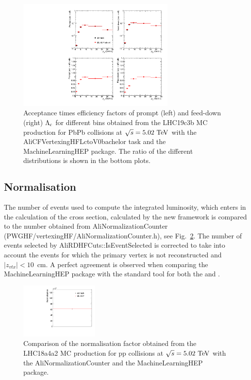 \begin{figure}[tb]
\begin{center}
\includegraphics[width=0.7\textwidth]{figures/LcEfficiencyComparison.pdf}
\caption{Acceptance times efficiency factors of prompt (left) and feed-down (right) $\mbox{$\mathrm {\Lambda_{c}}$}$ for different \pt bins obtained from the LHC19c3b MC production for PbPb collisions at $\sqrt{s}=5.02~\mathrm{TeV}$ with the AliCFVertexingHFLctoV0bachelor task and the MachineLearningHEP package. The ratio of the different distributions is shown in the bottom plots. }
\label{fig:EffLcComparisonMCPbPb}
\end{center}
\end{figure}

\subsection{Normalisation}
\label{subsec:normValidation}

The number of events used to compute the integrated luminosity, which enters in the calculation of the cross section, calculated by the new framework is compared to the number obtained from AliNormalizationCounter (PWGHF/vertexingHF/AliNormalizationCounter.h), see Fig.~\ref{fig:NormalisationComparisonMCpp}. The number of events selected by AliRDHFCuts::IsEventSelected is corrected to take into account the events for which the primary vertex is not reconstructed and $|z_{vtx}|<10$~cm. A perfect agreement is observed when comparing the MachineLearningHEP package with the standard tool for both the \Ds and \Lc.
 
 \begin{figure}[tb]
\begin{center}
\includegraphics[width=0.35\textwidth]{figures/NormComparison.pdf}
\caption{Comparison of the normalisation factor obtained from the LHC18a4a2 MC production for pp collisions at $\sqrt{s}=5.02~\mathrm{TeV}$ with the AliNormalizationCounter and the MachineLearningHEP package.}
\label{fig:NormalisationComparisonMCpp} 
\end{center}
\end{figure}
